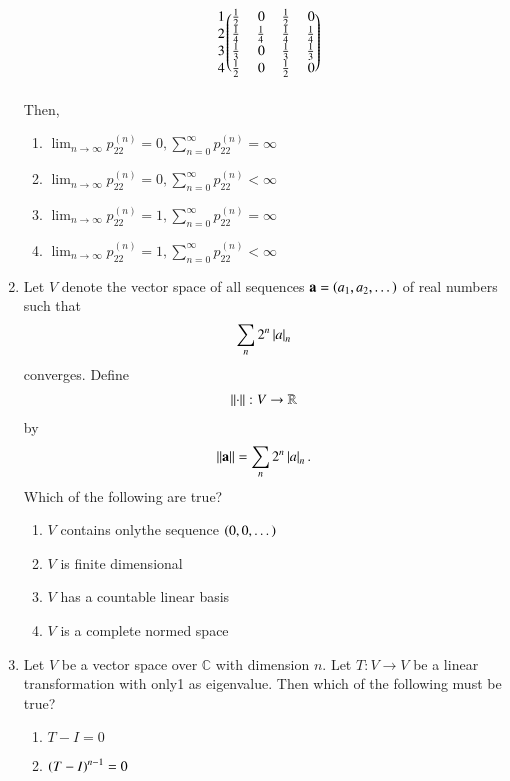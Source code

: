 \begin{enumerate}[label=\thesection.\arabic*.,ref=\thesection.\theenumi]
\begin{align}
\begin{blockarray}{c@{\hspace{1pt}}rrrr@{\hspace{3pt}}}
\begin{block}{r@{\hspace{3pt}}@{\hspace{1pt}}
    (@{\hspace{1pt}}rrrr@{\hspace{1pt}}@{\hspace{1pt}})}
        1 & \frac{1}{2} & 0 & \frac{1}{2} & 0  \\
        2 & \frac{1}{4}  & \frac{1}{4} & \frac{1}{4} & \frac{1}{4}  \\
        3 & \frac{1}{3}  & 0 & \frac{1}{3} & \frac{1}{3}  \\
%
        4 & \frac{1}{2} & 0 & \frac{1}{2} & 0  \\
        \end{block}
    \end{blockarray}
\end{align}
Then,
\begin{enumerate}
\item $\lim_{n \to \infty} p_{22}^{(n)} = 0, \sum_{n=0}^{\infty}p_{22}^{(n)} = \infty$
\item $\lim_{n \to \infty} p_{22}^{(n)} = 0, \sum_{n=0}^{\infty}p_{22}^{(n)} < \infty$
\item $\lim_{n \to \infty} p_{22}^{(n)} = 1, \sum_{n=0}^{\infty}p_{22}^{(n)} = \infty$
\item $\lim_{n \to \infty} p_{22}^{(n)} = 1, \sum_{n=0}^{\infty}p_{22}^{(n)} < \infty$
\end{enumerate}
\item Let $V$ denote the vector space of all sequences $\mathbf{a} = \left(a_1,a_2,\dots \right)$ of real numbers such that 
\begin{align}
\sum_{n}2^n\left\vert a\right\vert_n
\end{align}
converges.  Define
\begin{align}
\left\lVert\cdot\right\rVert: V \to \mathbb{R}
\end{align}
by
\begin{align}
\left\lVert\mathbf{a}\right\rVert = \sum_{n}2^n\left\vert a\right\vert_n.
\end{align}
%
Which of the following are true?
\begin{enumerate}
\item $V$ contains onlythe sequence $\left(0,0,\dots\right)$
\item $V$ is finite dimensional
\item $V$ has a countable linear basis
\item $V$ is a complete normed space
\end{enumerate}
%
\item Let $V$ be a vector space over $\mathbb{C}$ with dimension $n$.  Let $T:V\to V$ be a linear transformation with
only1 as eigenvalue.  Then which of the following must be true?
\begin{enumerate}
\item $T-I = 0$ 
\item $\left(T-I\right)^{n-1} = 0$ 

\end{enumerate}
\end{enumerate}
